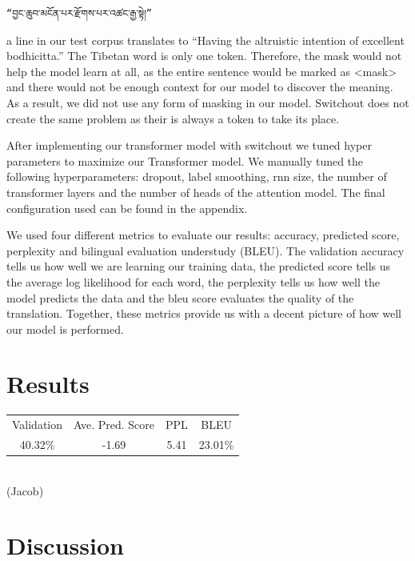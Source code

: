 \documentclass[letterpaper, 12 pt, conference]{ieeeconf}  %
\begin{document}
\begin{verbatim}
“བྱང་ཆུབ་མངོན་པར་རྫོགས་པར་འཚང་རྒྱ་སྟེ།” 
\end{verbatim}
a line in our test corpus translates to “Having the altruistic intention of excellent bodhicitta.” The Tibetan word is only one token. Therefore, the mask would not help the model learn at all, as the entire sentence would be marked as <mask> and there would not be enough context for our model to discover the meaning. As a result, we did not use any form of masking in our model. Switchout does not create the same problem as their is always a token to take its place. \par
After implementing our transformer model with switchout we tuned hyper parameters to maximize our Transformer model. We manually tuned the following hyperparameters: dropout, label smoothing, rnn size, the number of transformer layers and the number of heads of the attention model. The final configuration used can be found in the appendix. \par
We used four different metrics to evaluate our results: accuracy, predicted score, perplexity and bilingual evaluation understudy (BLEU). The validation accuracy tells us how well we are learning our training data, the predicted score tells us the average log likelihood for each word, the perplexity tells us how well the model predicts the data and the bleu score evaluates the quality of the translation. Together, these metrics provide us with a decent picture of how well our model is performed. 

\section{Results}
\begin{tabular}{ |c| c| c| c| }
 Validation & Ave. Pred. Score & PPL & BLEU \\ 
 40.32\% & -1.69 & 5.41 & 23.01\% \\

\end{tabular}\\

(Jacob)

\section{Discussion}
\end{document}
